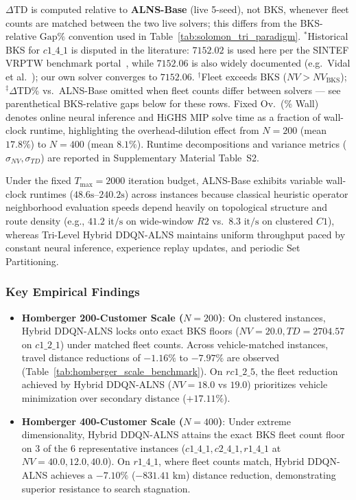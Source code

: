 \documentclass{ieeeaccess}
\begin{document}
\begin{table}[!t]
{\raggedright \footnotesize $\Delta$TD is computed relative to \textbf{ALNS-Base} (live 5-seed), not BKS, whenever fleet counts are matched between the two live solvers; this differs from the BKS-relative $\text{Gap\%}$ convention used in Table~\ref{tab:solomon_tri_paradigm}. $^*$Historical BKS for $c1\_4\_1$ is disputed in the literature: $7152.02$ is used here per the SINTEF VRPTW benchmark portal~\cite{sintef_homberger}, while $7152.06$ is also widely documented (e.g.\ Vidal et al.~\cite{vidal2013hybrid}); our own solver converges to $7152.06$. $^\dagger$Fleet exceeds BKS ($NV > NV_{\text{BKS}}$); $^\ddagger\Delta$TD\% vs.\ ALNS-Base omitted when fleet counts differ between solvers --- see parenthetical BKS-relative gaps below for these rows. Fixed Ov.\ (\% Wall) denotes online neural inference and HiGHS MIP solve time as a fraction of wall-clock runtime, highlighting the overhead-dilution effect from $N=200$ (mean $17.8\%$) to $N=400$ (mean $8.1\%$). Runtime decompositions and variance metrics ($\sigma_{NV}, \sigma_{TD}$) are reported in Supplementary Material Table~S2.\par}
\end{table}

Under the fixed $T_{\max}=2000$ iteration budget, ALNS-Base exhibits variable wall-clock runtimes ($48.6\text{s}$--$240.2\text{s}$) across instances because classical heuristic operator neighborhood evaluation speeds depend heavily on topological structure and route density (e.g., $41.2\text{ it/s}$ on wide-window $R2$ vs.\ $8.3\text{ it/s}$ on clustered $C1$), whereas Tri-Level Hybrid DDQN-ALNS maintains uniform throughput paced by constant neural inference, experience replay updates, and periodic Set Partitioning.

\subsubsection{Key Empirical Findings}
\begin{itemize}
    \item \textbf{Homberger 200-Customer Scale ($N=200$)}: On clustered instances, Hybrid DDQN-ALNS locks onto exact BKS floors ($NV=20.0, TD=2704.57$ on $c1\_2\_1$) under matched fleet counts. Across vehicle-matched instances, travel distance reductions of $-1.16\%$ to $-7.97\%$ are observed (Table~\ref{tab:homberger_scale_benchmark}). On $rc1\_2\_5$, the fleet reduction achieved by Hybrid DDQN-ALNS ($NV=18.0$ vs $19.0$) prioritizes vehicle minimization over secondary distance ($+17.11\%$).
    \item \textbf{Homberger 400-Customer Scale ($N=400$)}: Under extreme dimensionality, Hybrid DDQN-ALNS attains the exact BKS fleet count floor on 3 of the 6 representative instances ($c1\_4\_1, c2\_4\_1, r1\_4\_1$ at $NV=40.0, 12.0, 40.0$). On $r1\_4\_1$, where fleet counts match, Hybrid DDQN-ALNS achieves a $-7.10\%$ ($-831.41\text{ km}$) distance reduction, demonstrating superior resistance to search stagnation.
\end{itemize}
\end{document}
